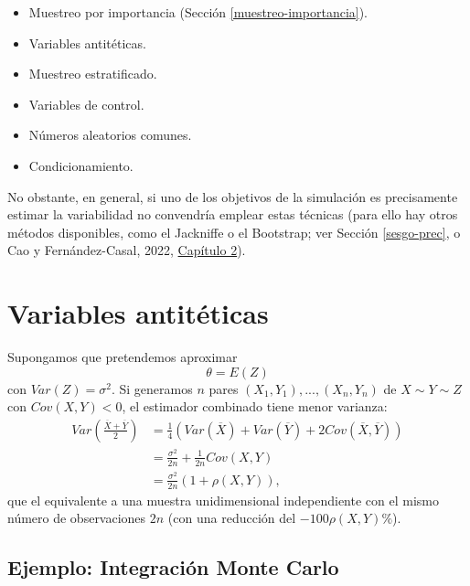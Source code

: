 \documentclass[
  spanish,
  10pt,
]{book}
\theoremstyle{break}
\theoremstyle{nonumberplain}
\begin{document}
\begin{itemize}
\item
  Muestreo por importancia (Sección \ref{muestreo-importancia}).
\item
  Variables antitéticas.
\item
  Muestreo estratificado.
\item
  Variables de control.
\item
  Números aleatorios comunes.
\item
  Condicionamiento.
\end{itemize}

No obstante, en general, si uno de los objetivos de la simulación es precisamente estimar la variabilidad no convendría emplear estas técnicas
(para ello hay otros métodos disponibles, como el Jackniffe o el Bootstrap; ver Sección \ref{sesgo-prec}, o Cao y Fernández-Casal, 2022, \href{https://rubenfcasal.github.io/book_remuestreo/prec-sesgo.html}{Capítulo 2}).

\section{Variables antitéticas}\label{variables-antituxe9ticas}

Supongamos que pretendemos aproximar
\[\theta=E\left(  Z\right)\]
con \(Var\left( Z \right) = \sigma^{2}\).
Si generamos \(n\) pares
\(\left(  X_{1},Y_{1}\right), ... ,\left( X_{n},Y_{n}\right)\)
de \(X\sim Y\sim Z\) con \(Cov\left(  X,Y\right) < 0\),
el estimador combinado tiene menor varianza:
\[\begin{aligned}
    Var\left(  \frac{\overline{X}+\overline{Y}}{2}\right)   & =\frac{1}{4}\left(
    Var\left(  \overline{X}\right)  +Var\left(  \overline{Y}\right)  +2Cov\left(
    \overline{X},\overline{Y}\right)  \right) \\
    & =\frac{\sigma^{2}}{2n}+\frac{1}{2n}Cov\left(  X,Y\right) \\
    & =\frac{\sigma^{2}}{2n}\left(  1+\rho \left(  X,Y\right)  \right),
\end{aligned}\]
que el equivalente a una muestra unidimensional independiente con el
mismo número de observaciones \(2n\) (con una reducción del
\(-100\rho \left( X,Y\right) \%\)).

\subsection{Ejemplo: Integración Monte Carlo}\label{ejemplo-integraciuxf3n-monte-carlo}
\end{document}
